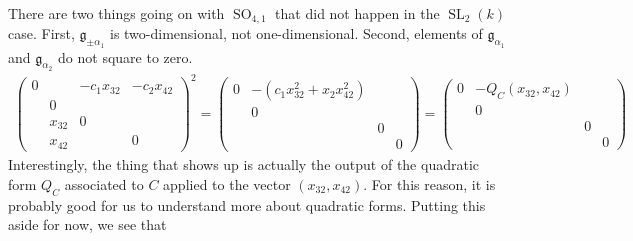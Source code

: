 \documentclass[12pt]{article}
\theoremstyle{definition}
\numberwithin{theorem}{subsection}
\newcommand{\lp}{\left(}
\newcommand{\rp}{\right)}
\newcommand{\noi}{\noindent}
\newcommand{\frakg}{\mathfrak{g}}
\DeclareMathOperator{\SL}{SL}
\DeclareMathOperator{\SO}{SO}
\begin{document}
\noi There are two things going on with $\SO_{4,1}$ that did not happen in the $\SL_2(k)$ case. First, $\frakg_{\pm \alpha_1}$ is two-dimensional, not one-dimensional. Second, elements of $\frakg_{\alpha_1}$ and $\frakg_{\alpha_2}$ do not square to zero.
\begin{align*}
	\begin{pmatrix}
		0 && - c_1 x_{32}  & - c_2 x_{42} \\
		& 0 &  \\
		& x_{32} & 0 &  \\
		& x_{42} && 0
	\end{pmatrix}^2 =
	\begin{pmatrix}
		0 & - \lp c_1 x_{32}^2 + x_2 x_{42}^2 \rp  &  &  \\ 
		 & 0 &  &  \\
		 &  & 0 &  \\
		 &  &  & 0
	\end{pmatrix}=
	\begin{pmatrix}
		0 & -  Q_C \lp x_{32}, x_{42} \rp  &  &  \\ 
		 & 0 &  &  \\
		 &  & 0 &  \\
		 &  &  & 0
	\end{pmatrix}
\end{align*}
Interestingly, the thing that shows up is actually the output of the quadratic form $Q_C$ associated to $C$ applied to the vector $(x_{32}, x_{42})$. For this reason, it is probably good for us to understand more about quadratic forms. Putting this aside for now, we see that
\end{document}

